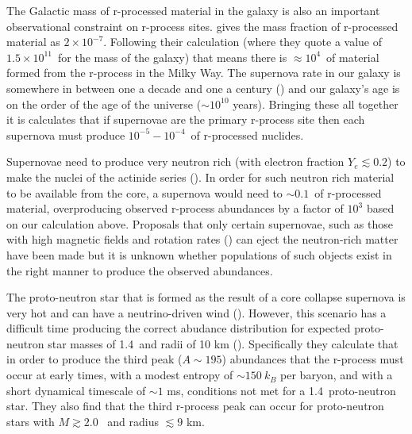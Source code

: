 {The Galactic mass of r-processed material in the galaxy is also an
important observational constraint on r-process
sites.  \cite{meyer1994} gives the mass fraction of r-processed
material as $2\times 10^{-7}$.  Following their calculation (where they
quote a value of $1.5\times10^{11}$\Msol\ for the mass of the galaxy)
that means there is $\approx 10^4$\Msol\ of material formed from the
r-process in the Milky Way.  The supernova rate in our galaxy is
somewhere in between one a decade and one a century
(\citealt{van1991}) and our galaxy's age is on the order of the age of
the universe ($\sim 10^{10}$ years).  Bringing these all together it
is calculates that if supernovae are the primary r-process site then
each supernova must produce $10^{-5}-10^{-4}$\Msol\ of r-processed
nuclides. 

Supernovae need to produce very neutron rich (with electron fraction
$Y_e\lesssim 0.2$) to make the nuclei of the actinide series
(\citealt{meyer1994}).  In order for such neutron rich material to be
available from the core, a supernova would need to  $\sim 0.1$\Msol\ of
r-processed material, overproducing observed r-process abundances by a
factor of $10^3$ based on our calculation above.  Proposals that only
certain supernovae, such as those with high magnetic fields and
rotation rates (\citealt{}) can eject the neutron-rich matter have
been made but it is unknown whether populations of such objects exist
in the right manner to produce the observed abundances. 

The proto-neutron star that is formed as the result of a core collapse
supernova is very hot and can have a neutrino-driven wind
(\citealt{meyer1994}). However, this scenario has a difficult time
producing the correct abudance distribution for expected proto-neutron
star masses of 1.4\Msol\ and radii of 10 km (\citealt{thompson2001}).
Specifically they calculate that in order to produce the third peak
($A\sim 195$) abundances that the r-process must occur at early times,
with a modest entropy of $\sim 150~k_B$ per baryon, and with a short
dynamical timescale of $\sim1$ ms, conditions not met for a 1.4\Msol\
proto-neutron star.  They also find that the third r-process peak can
occur for proto-neutron stars with $M\gtrsim 2.0$ \Msol\ and radius
$\lesssim9$ km.  

}
